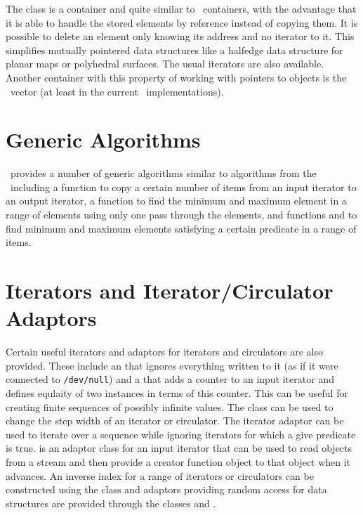 The class  is a container and quite similar
to \stl\ containers, with the advantage that it is able to handle the
stored elements by reference instead of copying them. It is possible
to delete an element only knowing its address and no iterator to it.
This simplifies mutually pointered data structures like a halfedge
data structure for planar maps or polyhedral surfaces. The usual
iterators are also available.  Another container with this property of
working with pointers to objects is the \stl\ vector (at least in the
current \stl\ implementations).

\section{Generic Algorithms}

\cgal\ provides a number of generic algorithms similar to algorithms from
the \stl\ including a  function to copy a certain number of 
items from an input iterator to an output iterator, a function
 to find the minimum and maximum element in a range
of elements using only one pass through the elements, and functions
 and  to find minimum and maximum
elements satisfying a certain predicate in a range of items.

\section{Iterators and Iterator/Circulator Adaptors}

Certain useful iterators and adaptors for iterators and circulators are also
provided.  These include an  that ignores everything
written to it (as if it were connected to \texttt{/dev/null}) and a
 that adds a counter to an input iterator and defines
equlaity of two instances in terms of this counter.  This can be useful for
creating finite sequences of possibly infinite values.  The 
class can be used to change the step width of an iterator or circulator.
The iterator adaptor  can be used to iterate over a
sequence while ignoring iterators for which a give predicate is true.
 is an adaptor class for an input iterator that 
can be used to read objects from a stream and then provide a creator
function object to that object when it advances.  An inverse index for a
range of iterators or circulators can be constructed using the class
 and adaptors providing random access for data structures
are provided through the classes  and
.

